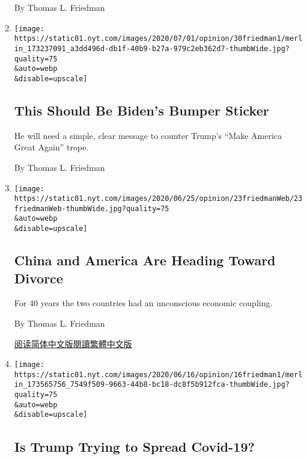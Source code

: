 \begin{enumerate}
  By Thomas L. Friedman
\item
  \href{/2020/06/30/opinion/biden-trump-respect.html}{}

  \texttt{[image: https://static01.nyt.com/images/2020/07/01/opinion/30friedman1/merlin\_173237091\_a3dd496d-db1f-40b9-b27a-979c2eb362d7-thumbWide.jpg?quality=75\\\&auto=webp\\\&disable=upscale]}

  \hypertarget{this-should-be-bidens-bumper-sticker}{%
  \subsection{This Should Be Biden's Bumper
  Sticker}\label{this-should-be-bidens-bumper-sticker}}

  He will need a simple, clear message to counter Trump's ``Make America
  Great Again'' trope.

  By Thomas L. Friedman
\item
  \href{/2020/06/23/opinion/china-united-states-trump.html}{}

  \texttt{[image: https://static01.nyt.com/images/2020/06/25/opinion/23friedmanWeb/23friedmanWeb-thumbWide.jpg?quality=75\\\&auto=webp\\\&disable=upscale]}

  \hypertarget{china-and-america-are-heading-toward-divorce}{%
  \subsection{China and America Are Heading Toward
  Divorce}\label{china-and-america-are-heading-toward-divorce}}

  For 40 years the two countries had an unconscious economic coupling.

  By Thomas L. Friedman

  \href{https://cn.nytimes.com/opinion/20200624/china-united-states-trump/}{阅读简体中文版}\href{https://cn.nytimes.com/opinion/20200624/china-united-states-trump/zh-hant/}{閱讀繁體中文版}
\item
  \href{/2020/06/16/opinion/trump-coronavirus.html}{}

  \texttt{[image: https://static01.nyt.com/images/2020/06/16/opinion/16friedman1/merlin\_173565756\_7549f509-9663-44b8-bc18-dc8f5b912fca-thumbWide.jpg?quality=75\\\&auto=webp\\\&disable=upscale]}

  \hypertarget{is-trump-trying-to-spread-covid-19}{%
  \subsection{Is Trump Trying to Spread
  Covid-19?}\label{is-trump-trying-to-spread-covid-19}}


\end{enumerate}
